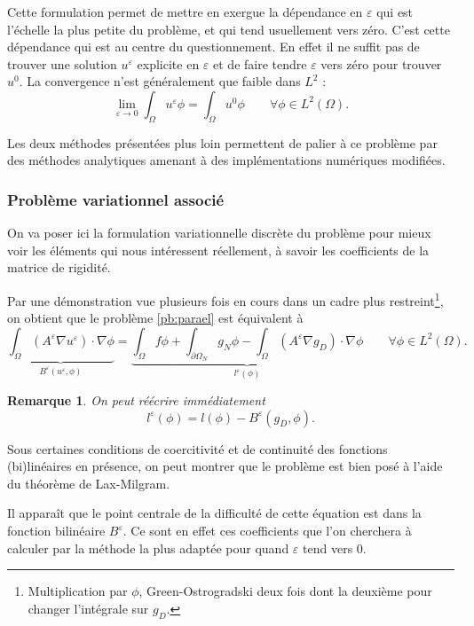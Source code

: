\documentclass[11pt]{article}
\newtheorem{rmq}{Remarque}
\newcommand{\Ae}{A^\varepsilon}
\newcommand{\Be}{B^\varepsilon}
\newcommand{\ue}{u^\varepsilon}
\begin{document}
Cette formulation permet de mettre en exergue la dépendance en $\varepsilon$ qui est l'échelle la plus petite du problème, et qui tend usuellement vers
zéro. C'est cette dépendance qui est au centre du questionnement. En effet il ne suffit pas de trouver une solution $\ue$ explicite en $\varepsilon$ et de
faire tendre $\varepsilon$ vers zéro pour trouver $u^0$. La convergence n'est généralement que faible dans $L^2$ :
\[
  \lim_{\varepsilon \to 0} \int_\Omega \ue \phi = \int_\Omega u^0 \phi \qquad \forall \phi \in L^2(\Omega).
\]

Les deux méthodes présentées plus loin permettent de palier à ce problème par des méthodes analytiques amenant à des implémentations numériques modifiées.


\subsubsection{Problème variationnel associé}
\label{sec:pbvar}

On va poser ici la formulation variationnelle discrète du problème pour mieux voir les éléments qui nous intéressent réellement, à savoir les coefficients
de la matrice de rigidité.

Par une démonstration vue plusieurs fois en cours dans un cadre plus restreint\footnote{Multiplication par $\phi$,
  Green-Ostrogradski deux fois dont la deuxième pour changer l'intégrale sur $g_D$.}, on obtient que le problème \ref{pb:parael} est équivalent à
\begin{equation}
  \underbrace{\int_\Omega (\Ae \nabla \ue)\cdot \nabla \phi}_{\Be(\ue, \phi)} =
  \underbrace{\int_\Omega f \phi + \int_{\partial \Omega_N} g_N \phi - \int_{\Omega} (\Ae \nabla g_D)\cdot \nabla \phi}_{l^{\varepsilon}(\phi)}
  \qquad \forall \phi \in L^2(\Omega).
\end{equation}

\begin{rmq}
  On peut réécrire immédiatement
  \[
    l^{\varepsilon}(\phi) = l(\phi) - \Be(g_D, \phi).
  \]
\end{rmq}

Sous certaines conditions de coercitivité et de continuité des fonctions (bi)linéaires en présence, on peut montrer que le problème est bien posé à l'aide
du théorème de Lax-Milgram.

Il apparaît que le point centrale de la difficulté de cette équation est dans la fonction bilinéaire $\Be$. Ce sont en effet ces coefficients que l'on
cherchera à calculer par la méthode la plus adaptée pour quand $\varepsilon$ tend vers 0.
\end{document}
